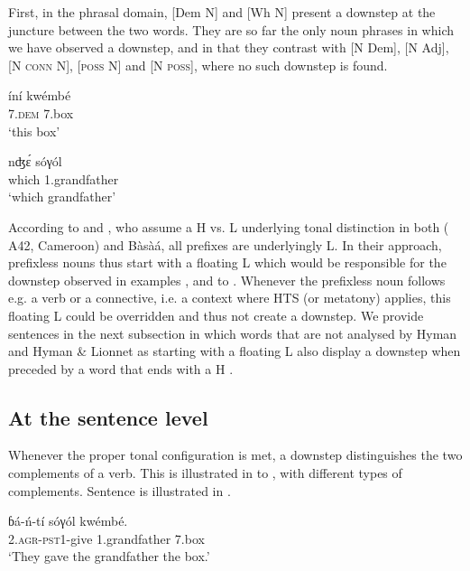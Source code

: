 \documentclass[output=paper,newtxmath,modfonts,nonflat,hidelinks]{langsci/langscibook}
\begin{document}
First, in the phrasal domain, [Dem N] and [Wh N] present a downstep at the juncture between the two words. They are so far the only noun phrases in which we have observed a downstep, and in that they contrast with [N Dem], [N Adj], [N \textsc{conn} N], [\textsc{poss} N] and [N \textsc{poss}], where no such downstep is found. 

\ea \gll íní {\textdownstep}kwémbé\\
7.\textsc{dem} 7.box\\
\glt `this box'\label{ex:HamlaouiMakasso:5}\\
\z

\ea \gll nʤ\'ɛ {\textdownstep}sóγól\\
which 1.grandfather\\
\glt `which grandfather' \label{ex:HamlaouiMakasso:6}\\
\z

\noindent According to \citet{Hyman03} and \citet{HymanLionnet14}, who assume a H vs. L underlying tonal distinction in both  ( A42, Cameroon) and Bàsà{á}, all  prefixes are underlyingly L. In their approach, prefixless nouns thus start with a floating L  which would be responsible for the downstep observed in examples ,  and  to . Whenever the prefixless noun follows e.g. a verb or a connective, i.e. a context where HTS (or metatony) applies, this floating L  could be overridden and thus not create a downstep. We provide sentences in the next subsection in which words that are not analysed by Hyman and Hyman \& Lionnet as starting with a floating L  also display a downstep when preceded by a word that ends with a H .


\subsection{At the sentence level}

Whenever the proper tonal configuration is met, a downstep distinguishes the two complements of a verb. This is illustrated in  to , with different types of complements. Sentence  is illustrated in .

\ea \gll  ɓ{á}-ń-tí sóγól {\textdownstep}kwémbé.\\
2.\textsc{agr}-\textsc{pst1}-give 1.grandfather 7.box\\
\glt `They gave the grandfather the box.'\label{ex:HamlaouiMakasso:7}
\z
\end{document}
